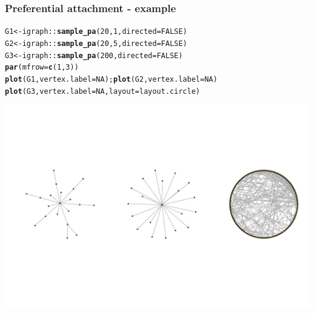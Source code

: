 \documentclass{beamer}\usepackage[]{graphicx}\usepackage[]{color}
\makeatletter
\newcommand{\hlnum}[1]{\textcolor[rgb]{0.686,0.059,0.569}{#1}}%
\newcommand{\hlopt}[1]{\textcolor[rgb]{0,0,0}{#1}}%
\newcommand{\hlstd}[1]{\textcolor[rgb]{0.345,0.345,0.345}{#1}}%
\newcommand{\hlkwb}[1]{\textcolor[rgb]{0.69,0.353,0.396}{#1}}%
\newcommand{\hlkwc}[1]{\textcolor[rgb]{0.333,0.667,0.333}{#1}}%
\newcommand{\hlkwd}[1]{\textcolor[rgb]{0.737,0.353,0.396}{\textbf{#1}}}%
\newenvironment{kframe}{%
 \def\at@end@of@kframe{}%
 \ifinner\ifhmode%
  \def\at@end@of@kframe{\end{minipage}}%
  \begin{minipage}{\columnwidth}%
 \fi\fi%
 \def\FrameCommand##1{\hskip\@totalleftmargin \hskip-\fboxsep
 \colorbox{shadecolor}{##1}\hskip-\fboxsep
     \hskip-\linewidth \hskip-\@totalleftmargin \hskip\columnwidth}%
 \MakeFramed {\advance\hsize-\width
   \@totalleftmargin\z@ \linewidth\hsize
   \@setminipage}}%
 {\par\unskip\endMakeFramed%
 \at@end@of@kframe}
\newenvironment{knitrout}{}{} %
\makeatother
\begin{document}
\begin{frame}[fragile]
  \frametitle{Preferential attachment - example}

\begin{knitrout}\scriptsize
{}\color{fgcolor}\begin{kframe}
\begin{alltt}
\hlstd{G1} \hlkwb{<-} \hlstd{igraph}\hlopt{::}\hlkwd{sample_pa}\hlstd{(}\hlnum{20}\hlstd{,} \hlnum{1}\hlstd{,} \hlkwc{directed}\hlstd{=}\hlnum{FALSE}\hlstd{)}
\hlstd{G2} \hlkwb{<-} \hlstd{igraph}\hlopt{::}\hlkwd{sample_pa}\hlstd{(}\hlnum{20}\hlstd{,} \hlnum{5}\hlstd{,} \hlkwc{directed}\hlstd{=}\hlnum{FALSE}\hlstd{)}
\hlstd{G3} \hlkwb{<-} \hlstd{igraph}\hlopt{::}\hlkwd{sample_pa}\hlstd{(}\hlnum{200}\hlstd{,} \hlkwc{directed}\hlstd{=}\hlnum{FALSE}\hlstd{)}
\hlkwd{par}\hlstd{(}\hlkwc{mfrow}\hlstd{=}\hlkwd{c}\hlstd{(}\hlnum{1}\hlstd{,}\hlnum{3}\hlstd{))}
\hlkwd{plot}\hlstd{(G1,} \hlkwc{vertex.label}\hlstd{=}\hlnum{NA}\hlstd{) ;} \hlkwd{plot}\hlstd{(G2,} \hlkwc{vertex.label}\hlstd{=}\hlnum{NA}\hlstd{)}
\hlkwd{plot}\hlstd{(G3,} \hlkwc{vertex.label}\hlstd{=}\hlnum{NA}\hlstd{,} \hlkwc{layout}\hlstd{=layout.circle)}
\end{alltt}
\end{kframe}
\includegraphics[width=.8\textwidth]{figures/PA_example-1} 

\end{knitrout}

\end{frame}
\end{document}
